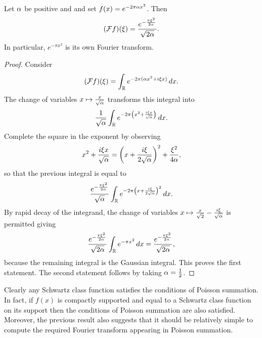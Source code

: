     \begin{proposition}\label{prop:Fourier_transform_of_exponential_single_variable}
      Let \(\alpha\) be positive and and set \(f(x) = e^{-2\pi\alpha x^{2}}\). Then
      \[
        (\mathcal{F}f)(\xi) = \frac{e^{-\frac{\pi\xi^{2}}{2\alpha}}}{\sqrt{2\alpha}}.
      \]
      In particular, \(e^{-\pi x^{2}}\) is its own Fourier transform.
    \end{proposition}
    \begin{proof}
      Consider
      \[
        (\mathcal{F}f)(\xi) = \int_{\mathbb{R}}e^{-2\pi(\alpha x^{2}+i\xi x)}\,dx.
      \]
      The change of variables \(x \mapsto \frac{x}{\sqrt{\alpha}}\) transforms this integral into
      \[
        \frac{1}{\sqrt{\alpha}}\int_{\mathbb{R}}e^{-2\pi\left(x^{2}+\frac{i\xi x}{\sqrt{\alpha}}\right)}\,dx.
      \]
      Complete the square in the exponent by observing
      \[
        x^{2}+\frac{i\xi x}{\sqrt{\alpha}} = \left(x+\frac{i\xi}{2\sqrt{\alpha}}\right)^{2}+\frac{\xi^{2}}{4\alpha},
      \]
      so that the previous integral is equal to
      \[
        \frac{e^{-\frac{\pi\xi^{2}}{2\alpha}}}{\sqrt{\alpha}}\int_{\mathbb{R}}e^{-2\pi\left(x+\frac{i\xi}{2\sqrt{\alpha}}\right)^{2}}\,dx.
      \]
      By rapid decay of the integrand, the change of variables \(x \mapsto \frac{x}{\sqrt{2}}-\frac{i\xi}{\sqrt{\alpha}}\) is permitted giving
      \[
        \frac{e^{-\frac{\pi\xi^{2}}{2\alpha}}}{\sqrt{2\alpha}}\int_{\mathbb{R}}e^{-\pi x^{2}}\,dx = \frac{e^{-\frac{\pi\xi^{2}}{2\alpha}}}{\sqrt{2\alpha}},
      \]
      because the remaining integral is the Gaussian integral. This proves the first statement. The second statement follows by taking \(\alpha = \frac{1}{2}\).
    \end{proof}

    Clearly any Schwartz class function satisfies the conditions of Poisson summation. In fact, if \(f(x)\) is compactly supported and equal to a Schwartz class function on its support then the conditions of Poisson summation are also satisfied. Moreover, the previous result also suggests that it should be relatively simple to compute the required Fourier transform appearing in Poisson summation.